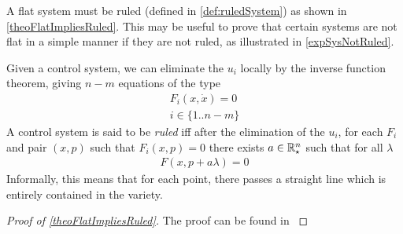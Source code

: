 \documentclass[12pt]{article}
\begin{document}
\begin{remark}
  A flat system must be ruled (defined in \ref{def:ruledSystem}) as shown in  \ref{theoFlatImpliesRuled}.
  This may be useful to prove that certain systems are not flat in a simple manner if they are not ruled,
  as illustrated in \ref{expSysNotRuled}.
\end{remark}

\begin{definition} \label{def:ruledSystem}
  Given a control system, we can eliminate the $u_i$ locally by the inverse function theorem,
  giving $n-m$ equations of the type
  \begin{equation}\begin{aligned}
    F_i(x,\dot{x}) = 0 \\
    i \in \{1 .. n-m\}
  \end{aligned}\end{equation}
  A control system is said to be \emph{ruled} iff after the elimination of the $u_i$, for each
  $F_i$ and pair $(x,p)$ such that $F_i(x,p)=0$ there exists $a \in \mathbb{R}_\star^n$ such that for all $\lambda$
  \begin{equation}\begin{aligned}
    F(x, p + a\lambda) = 0
  \end{aligned}\end{equation}
  Informally, this means that for each point, there passes a straight line which is
  entirely contained in the variety.
\end{definition}

\begin{theorem} \label{theoFlatImpliesRuled}
\end{theorem}
\begin{proof}[ Proof of \ref{theoFlatImpliesRuled}]
  The proof can be found in \cite[p.58, theorem 3.26]{MR99}
\end{proof}
\end{document}
